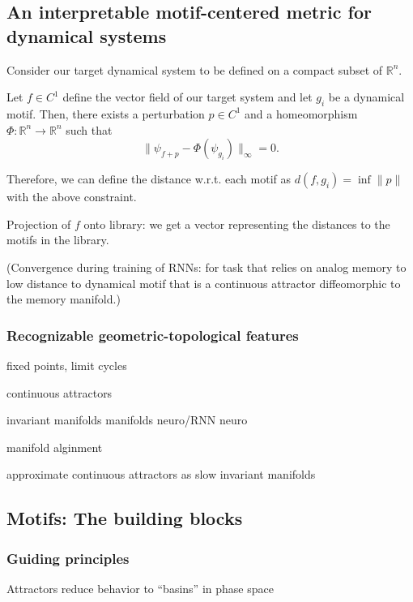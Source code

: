 \documentclass{article}
\newcommand{\ascomment}[1]{\textcolor{ascolor}{(#1)}}
\theoremstyle{definition} \newtheorem{definition}{Definition}  \newtheorem{example}{Example}
\theoremstyle{remark} \newtheorem{remark}{Remark}
\newcommand{\reals}{\mathbb{R}}
\newcounter{ct}
\begin{document}
\subsection{An interpretable motif-centered metric for dynamical systems}\label{sec:aut_motif_metric}
Consider our target dynamical system to be defined on a compact subset of $\reals^n$.

Let $f\in C^1$ define the vector field of our target system
and let $g_i$ be a dynamical motif.
Then, there exists a perturbation $p\in C^1$ 
 and a homeomorphism $\Phi:\reals^n\rightarrow\reals^n$ such that 
\begin{equation}\label{eq:perfect_motif_fit}
\|\psi_{f+p} - \Phi(\psi_{g_i})\|_\infty = 0.
\end{equation}

Therefore, we can define the distance w.r.t. each motif as $d(f,g_i) = \inf \|p\|$ with the above constraint.

Projection of $f$ onto library: we get a vector representing the distances to the motifs in the library.

\ascomment{Convergence during training of RNNs: for task that relies on analog memory to low distance to dynamical motif that is a continuous attractor diffeomorphic to the memory manifold.}


\subsubsection{Recognizable geometric-topological features}
fixed points, limit cycles

continuous attractors

invariant manifolds
manifolds neuro/RNN\citep{langdon2023unifying, can2021emergence,
cueva2021continuous,
gort2024emergence,
mishra2021continual,
chaudhuri2019attractor, ghazizadeh2021slowmanifold, duncker2021dynamics, pezon2024linking}
neuro \citep{fortunato2024nonlinear}

manifold alginment \citep{kuoch2024probing}

approximate continuous attractors as slow invariant manifolds\citep{Sagodi2024a}


\subsection{Motifs: The building blocks}
\subsubsection{Guiding principles}
Attractors reduce behavior to ``basins'' in phase space
\end{document}
